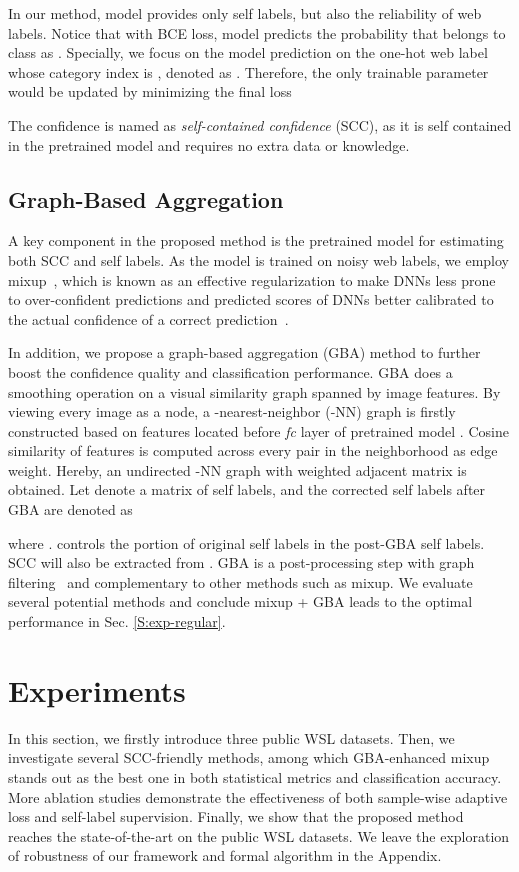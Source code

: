 \documentclass[runningheads]{llncs}
\begin{document}
In our method, model  provides only self labels, but also the reliability of web labels. Notice that with BCE loss, model  predicts the probability that  belongs to class  as . Specially, we focus on the model prediction on the one-hot web label  whose category index is , denoted as . 
Therefore, the only trainable parameter  would be updated by minimizing the final loss 

The confidence  is named as \emph{self-contained confidence} (SCC), as it is self contained in the pretrained model and requires no extra data or knowledge.

\subsection{Graph-Based Aggregation}
\label{S:method-model}
A key component in the proposed method is the pretrained model  for estimating both SCC and self labels. As the model is trained on noisy web labels, we employ
mixup~\cite{zhang2018mixup}, which is known as an effective regularization to make DNNs less prone to over-confident predictions and predicted scores of DNNs better calibrated to the actual confidence of a correct prediction~\cite{thulasidasan2019mixup}.

In addition, we propose a graph-based aggregation (GBA) method to further boost the confidence quality and classification performance. GBA does a smoothing operation on a visual similarity graph spanned by image features. By viewing every image as a node, a -nearest-neighbor (-NN) graph is firstly constructed based on features located before \textit{fc} layer of pretrained model . Cosine similarity of features is computed across every pair in the neighborhood as edge weight. Hereby, an undirected -NN graph with weighted adjacent matrix  is obtained. Let  denote a matrix of self labels, and the corrected self labels after GBA are denoted as

where .  controls the portion of original self labels in the post-GBA self labels. SCC will also be extracted from .
GBA is a post-processing step with graph filtering~\cite{kipf2016gcn} and complementary to other methods such as mixup. We evaluate several potential methods and conclude mixup + GBA leads to the optimal performance in Sec. \ref{S:exp-regular}. 
	
\section{Experiments}
In this section, we firstly introduce three public WSL datasets. Then, we investigate several SCC-friendly methods, among which GBA-enhanced mixup stands out as the best one in both statistical metrics and classification accuracy. More ablation studies demonstrate the effectiveness of both sample-wise adaptive loss and self-label supervision. Finally, we show that the proposed method reaches the state-of-the-art on the public WSL datasets. We leave the exploration of robustness of our framework and formal algorithm in the Appendix.
\end{document}
